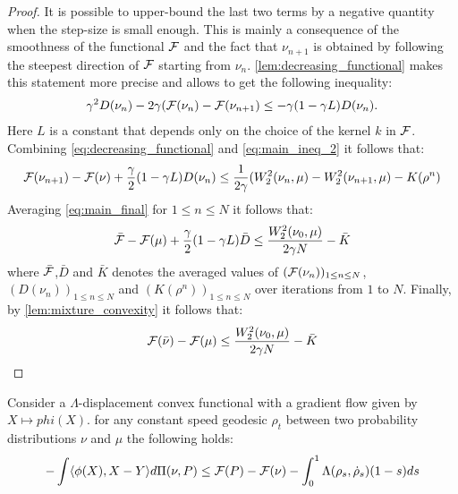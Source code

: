 \begin{proof}
It is possible to upper-bound the last two terms by a negative quantity when the step-size is small enough. This is mainly a consequence of the smoothness of the functional ${{\mathcal F}}$ and the fact that $\nu_{n+1}$ is obtained by following the steepest direction of ${{\mathcal F}}$ starting from $\nu_n$. \ref{lem:decreasing_functional} makes this statement more precise and allows to get the following inequality:
\begin{align}
	\gamma^2 D(\nu_n) -2\gamma ({{\mathcal F}}(\nu_n)-{{\mathcal F}}(\nu_{n+1})\leq -\gamma (1-\gamma L)D(\nu_n).
	\label{eq:decreasing_functional}
\end{align}
Here $L$ is a constant that depends only on the choice of the kernel $k$ in ${{\mathcal F}}$. Combining \ref{eq:decreasing_functional} and \ref{eq:main_ineq_2} it follows that:
\begin{align}
{{\mathcal F}}(\nu_{n+1})-{{\mathcal F}}(\nu)+\frac{\gamma}{2}(1-\gamma L)D(\nu_n)
\leq 
\frac{1}{2\gamma} (W_2^2(\nu_n,\mu)-W_2^2(\nu_{n+1},\mu)-K(\rho^n)
\label{eq:main_final}
\end{align}
Averaging \ref{eq:main_final} for $1\leq n\leq N$ it follows that:
\begin{align}
	\bar{{{\mathcal F}}}-{{\mathcal F}}(\mu)+\frac{\gamma}{2}(1-\gamma L)\bar{D} \leq \frac{W_2^2(\nu_0,\mu)}{2 \gamma N} -\bar{K}
\end{align}
where $\bar{{{\mathcal F}}}$,$\bar{D}$ and $\bar{K}$ denotes the averaged values of $({{\mathcal F}}(\nu_n))_{1\leq n \leq N}$, $(D(\nu_n))_{1\leq n \leq N}$  and $(K(\rho^n))_{1\leq n \leq N}$ over iterations from $1$ to $N$. Finally, by \ref{lem:mixture_convexity} it follows that:
\begin{align}
{{\mathcal F}}(\bar{\nu})-{{\mathcal F}}(\mu)\leq  \frac{W_2^2(\nu_0,\mu)}{2 \gamma N} -\bar{K}
\end{align}

\end{proof}



\begin{lemma}	\label{lem:grad_flow_lambda_version}
Consider a $\Lambda$-displacement convex functional with a gradient flow given by  $X\mapsto phi(X)$. for any constant speed geodesic $\rho_t$ between two probability distributions $\nu$ and $\mu$ the following holds:
\begin{align*}
	-\int \langle \phi(X),X-Y \rangle d\Pi(\nu,P)
	\leq
	{{\mathcal F}}(P)- {{\mathcal F}}(\nu) -\int_0^1 \Lambda(\rho_s,\dot{\rho}_s)(1-s)ds
\end{align*}

\end{lemma}


